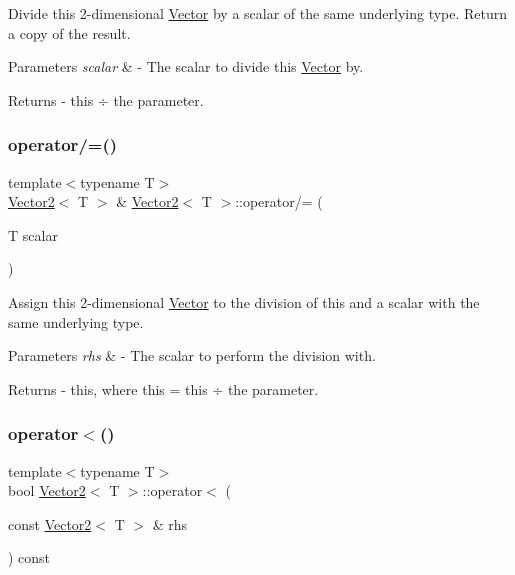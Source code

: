 Divide this 2-\/dimensional \mbox{\hyperlink{class_vector}{Vector}} by a scalar of the same underlying type. Return a copy of the result. 
\begin{DoxyParams}{Parameters}
{\em scalar} & -\/ The scalar to divide this \mbox{\hyperlink{class_vector}{Vector}} by. \\
\hline
\end{DoxyParams}
\begin{DoxyReturn}{Returns}
-\/ this ÷ the parameter. 
\end{DoxyReturn}
\mbox{\label{class_vector2_a9e79272d8b7b39e8d8eafa6f4cbad04e}} 
\subsubsection{\texorpdfstring{operator/=()}{operator/=()}}
{\footnotesize\ttfamily template$<$typename T$>$ \\
\mbox{\hyperlink{class_vector2}{Vector2}}$<$ T $>$ \& \mbox{\hyperlink{class_vector2}{Vector2}}$<$ T $>$\+::operator/= (\begin{DoxyParamCaption}\item[{T}]{scalar }\end{DoxyParamCaption})}

Assign this 2-\/dimensional \mbox{\hyperlink{class_vector}{Vector}} to the division of this and a scalar with the same underlying type. 
\begin{DoxyParams}{Parameters}
{\em rhs} & -\/ The scalar to perform the division with. \\
\hline
\end{DoxyParams}
\begin{DoxyReturn}{Returns}
-\/ this, where \textquotesingle{}this = this ÷ the parameter\textquotesingle{}. 
\end{DoxyReturn}
\mbox{\label{class_vector2_abeb4df28fbd42c319b3e5529a1805e90}} 
\subsubsection{\texorpdfstring{operator$<$()}{operator<()}}
{\footnotesize\ttfamily template$<$typename T$>$ \\
bool \mbox{\hyperlink{class_vector2}{Vector2}}$<$ T $>$\+::operator$<$ (\begin{DoxyParamCaption}\item[{const \mbox{\hyperlink{class_vector2}{Vector2}}$<$ T $>$ \&}]{rhs }\end{DoxyParamCaption}) const}

